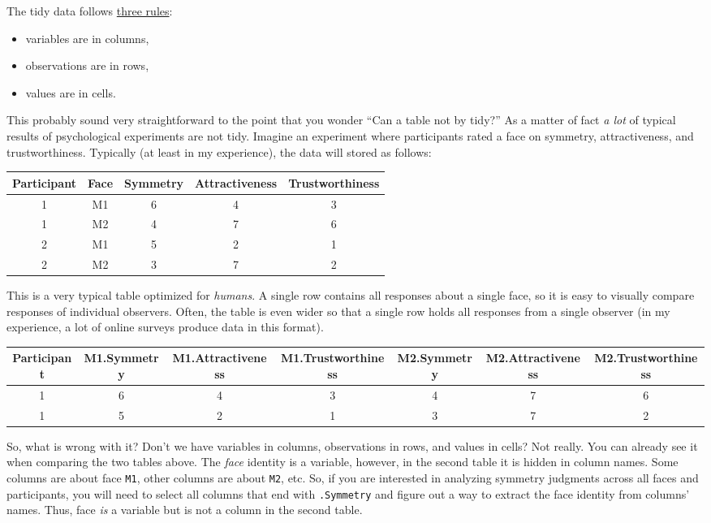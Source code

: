 \documentclass[
]{book}
\providecommand{\tightlist}{%
  \setlength{\itemsep}{0pt}\setlength{\parskip}{0pt}}
\begin{document}
The tidy data follows \href{https://r4ds.had.co.nz/tidy-data.html}{three rules}:

\begin{itemize}
\tightlist
\item
  variables are in columns,
\item
  observations are in rows,
\item
  values are in cells.
\end{itemize}

This probably sound very straightforward to the point that you wonder ``Can a table not by tidy?'' As a matter of fact \emph{a lot} of typical results of psychological experiments are not tidy. Imagine an experiment where participants rated a face on symmetry, attractiveness, and trustworthiness. Typically (at least in my experience), the data will stored as follows:

\begin{tabular}{c|c|c|c|c}
\hline
Participant & Face & Symmetry & Attractiveness & Trustworthiness\\
\hline
1 & M1 & 6 & 4 & 3\\
\hline
1 & M2 & 4 & 7 & 6\\
\hline
2 & M1 & 5 & 2 & 1\\
\hline
2 & M2 & 3 & 7 & 2\\
\hline
\end{tabular}

This is a very typical table optimized for \emph{humans}. A single row contains all responses about a single face, so it is easy to visually compare responses of individual observers. Often, the table is even wider so that a single row holds all responses from a single observer (in my experience, a lot of online surveys produce data in this format).

\begin{tabular}{c|c|c|c|c|c|c}
\hline
Participant & M1.Symmetry & M1.Attractiveness & M1.Trustworthiness & M2.Symmetry & M2.Attractiveness & M2.Trustworthiness\\
\hline
1 & 6 & 4 & 3 & 4 & 7 & 6\\
\hline
1 & 5 & 2 & 1 & 3 & 7 & 2\\
\hline
\end{tabular}

So, what is wrong with it? Don't we have variables in columns, observations in rows, and values in cells? Not really. You can already see it when comparing the two tables above. The \emph{face} identity is a variable, however, in the second table it is hidden in column names. Some columns are about face \texttt{M1}, other columns are about \texttt{M2}, etc. So, if you are interested in analyzing symmetry judgments across all faces and participants, you will need to select all columns that end with \texttt{.Symmetry} and figure out a way to extract the face identity from columns' names. Thus, face \emph{is} a variable but is not a column in the second table.
\end{document}
